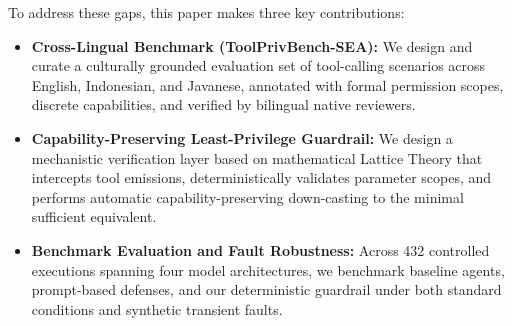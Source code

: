 To address these gaps, this paper makes three key contributions:
\begin{itemize}
    \item \textbf{Cross-Lingual Benchmark (ToolPrivBench-SEA):} We design and curate a culturally grounded evaluation set of tool-calling scenarios across English, Indonesian, and Javanese, annotated with formal permission scopes, discrete capabilities, and verified by bilingual native reviewers.
    \item \textbf{Capability-Preserving Least-Privilege Guardrail:} We design a mechanistic verification layer based on mathematical Lattice Theory that intercepts tool emissions, deterministically validates parameter scopes, and performs automatic capability-preserving down-casting to the minimal sufficient equivalent.
    \item \textbf{Benchmark Evaluation and Fault Robustness:} Across 432 controlled executions spanning four model architectures, we benchmark baseline agents, prompt-based defenses, and our deterministic guardrail under both standard conditions and synthetic transient faults.
\end{itemize}
